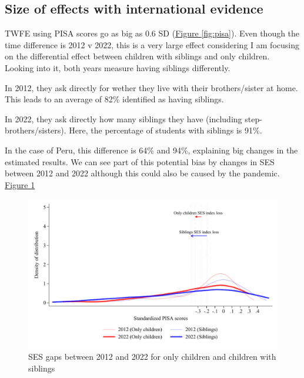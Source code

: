 
%





\clearpage
\subsection{Size of effects with international evidence}

TWFE using PISA scores go as big as 0.6 SD (\hyperref[fig:pisa]{Figure \ref{fig:pisa}}). Even though the time difference is 2012 v 2022, this is a very large effect considering I am focusing on the differential effect between children with siblings and only children. Looking into it, both years measure having siblings differently.

In 2012, they ask directly for wether they live with their brothers/sister at home. This leads to an average of 82\% identified as having siblings.

In 2022, they ask directly how many siblings they have (including step-brothers/sisters). Here, the percentage of students with siblings is 91\%.

In the case of Peru, this difference is 64\% and 94\%, explaining big changes in the estimated results. We can see part of this potential bias by changes in SES between 2012 and 2022 although this could also be caused by the pandemic. \hyperref[fig:pisa_ses]{Figure \ref{fig:pisa_ses}}




\begin{figure}[htbp]
    \centering
\includegraphics[width=\textwidth]{./FIGURES/Descriptive/PISA_distribution_2012_2022_ses.pdf}
        \caption{SES gaps between 2012 and 2022 for only children and children with siblings}
        \label{fig:pisa_ses}

\end{figure}

